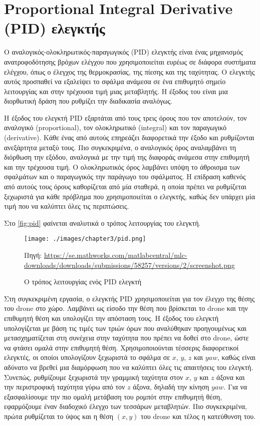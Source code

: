 \section{Proportional Integral Derivative (PID) ελεγκτής}
\label{section:pid}

Ο αναλογικός-ολοκληρωτικός-παραγωγικός (PID) ελεγκτής είναι ένας μηχανισμός ανατροφοδότησης βρόχων ελέγχου που χρησιμοποιείται ευρέως σε διάφορα συστήματα ελέγχου, όπως ο έλεγχος της θερμοκρασίας, της πίεσης και της ταχύτητας. Ο ελεγκτής αυτός προσπαθεί να εξαλείψει το σφάλμα ανάμεσα σε ένα επιθυμητό σημείο λειτουργίας και στην τρέχουσα τιμή μιας μεταβλητής. Η έξοδος του είναι μια διορθωτική δράση που ρυθμίζει την διαδικασία αναλόγως.

Η έξοδος του ελεγκτή PID εξαρτάται από τους τρεις όρους που τον αποτελούν, τον αναλογικό (proportional), τον ολοκληρωτικό (integral) και τον παραγωγικό (derivative). Κάθε ένας από αυτούς επηρεάζει διαφορετικά την έξοδο και ρυθμίζονται ανεξάρτητα μεταξύ τους. Πιο συγκεκριμένα, ο αναλογικός όρος αναλαμβάνει τη διόρθωση την εξόδου, αναλογικά με την τιμή της διαφοράς ανάμεσα στην επιθυμητή και την τρέχουσα τιμή. Ο ολοκληρωτικός όρος λαμβάνει υπόψη το άθροισμα των σφαλμάτων και ο παραγωγικός την παράγωγο του σφάλματος. Η επίδραση καθενός από αυτούς τους όρους καθορίζεται από μία σταθερά, η οποία πρέπει να ρυθμίζεται ξεχωριστά για κάθε πρόβλημα που χρησιμοποιείται ο ελεγκτής, καθώς δεν υπάρχει μία τιμή που να καλύπτει όλες τις περιπτώσεις.

Στο \autoref{fig:pid} φαίνεται αναλυτικά ο τρόπος λειτουργίας του ελεγκτή.

\begin{figure}[!ht]
    \centering
    \texttt{[image: ./images/chapter3/pid.png]}
    \caption{Ο τρόπος λειτουργίας ενός PID ελεγκτή} 
    Πηγή: \href{https://se.mathworks.com/matlabcentral/mlc-downloads/downloads/submissions/58257/versions/2/screenshot.png}{https://se.mathworks.com/matlabcentral/mlc-downloads/downloads/submissions/58257/versions/2/screenshot.png}
    \label{fig:pid}
\end{figure}

Στη συγκεκριμένη εργασία, ο ελεγκτής PID χρησιμοποιείται για τον έλεγχο της θέσης του drone στο χώρο. Λαμβάνει ως είσοδο την θέση που βρίσκεται το drone και την επιθυμητή θέση και υπολογίζει την απόσταση τους. Η έξοδος του ελεγκτή υπολογίζεται με βάση τις τιμές των τριών όρων που αναλύθηκαν προηγουμένως και μετασχηματίζεται στη συνέχεια στην ταχύτητα που πρέπει να δοθεί στο drone, ώστε να φτάσει ομαλά στην επιθυμητή θέση. Χρησιμοποιούνται τέσσερις διαφορετικοί ελεγκτές, οι οποίοι υπολογίζουν ξεχωριστά το σφάλμα σε $x$, $y$, $z$ και $yaw$, καθώς είναι αδύνατο να βρεθεί μια διαμόρφωση που να καλύπτει όλες τις απαιτήσεις του ελεγκτή. Συνεπώς, ρυθμίζουμε ξεχωριστά την γραμμική ταχύτητα στον $x$, $y$ και $z$ άξονα και την περιστροφική ταχύτητα γύρω από τον $z$ άξονα, δηλαδή την κίνηση $yaw$. Για να εξασφαλίσουμε την πιο ομαλή μετάβαση του ρομπότ στην επιθυμητή θέση, εφαρμόζουμε έναν διαδοχικό έλεγχο των τεσσάρων μεταβλητών. Πιο συγκεκριμένα, πρώτα ρυθμίζεται το ύψος και η θέση $(x,y)$ του drone και τέλος η κατεύθυνση του.

